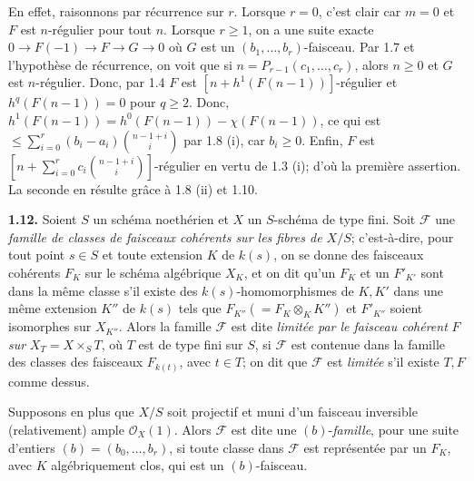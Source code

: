 En
effet, raisonnons par récurrence sur \(r\). Lorsque \(r=0\), c'est clair car \(m=0\) et \(F\) est \(n\)-régulier pour tout \(n\). Lorsque \(r\ge1\), on a une suite exacte $0\longrightarrow F(-1)\longrightarrow F\longrightarrow G\longrightarrow0$ où \(G\) est un \((b_1,\ldots,b_r)\)-faisceau. Par 1.7 et l'hypothèse de récurrence, on voit que si \(n=P_{r-1}(c_1,\ldots,c_r)\), alors \(n\ge0\) et \(G\) est \(n\)-régulier. Donc, par 1.4 \(F\) est \([n+h^1(F(n-1))]\)-régulier et \(h^q(F(n-1))=0\) pour \(q\ge2\). Donc, \(h^1(F(n-1))=h^0(F(n-1))-\chi(F(n-1))\), ce qui est \(\le \sum_{i=0}^{r}(b_i-a_i)\binom{n-1+i}{i}\) par 1.8 (i), car \(b_i\ge0\). Enfin, \(F\) est \(\left[n+\sum_{i=0}^{r}c_i\binom{n-1+i}{i}\right]\)-régulier en vertu de 1.3 (i); d'où la première assertion. La seconde en résulte grâce à 1.8 (ii) et 1.10.

\textbf{1.12.} Soient \(S\) un schéma noethérien et \(X\) un \(S\)-schéma de type fini. Soit \(\mathcal F\) une \emph{famille de classes de faisceaux cohérents sur les fibres de \(X/S\)}; c'est-à-dire, pour tout point \(s\in S\) et toute extension \(K\) de \(k(s)\), on se donne des faisceaux cohérents \(F_K\) sur le schéma algébrique \(X_K\), et on dit qu'un \(F_K\) et un \(F'_{K'}\) sont dans la même classe s'il existe des \(k(s)\)-homomorphismes de \(K,K'\) dans une même extension \(K''\) de \(k(s)\) tels que \(F_{K''}(=F_K\otimes_K K'')\) et \(F'_{K''}\) soient isomorphes sur \(X_{K''}\). Alors la famille \(\mathcal F\) est dite \emph{limitée par le faisceau cohérent} \(F\) \emph{sur} \(X_T=X\times_S T\), où \(T\) est de type fini sur \(S\), si \(\mathcal F\) est contenue dans la famille des classes des faisceaux \(F_{k(t)}\), avec \(t\in T\); on dit que \(\mathcal F\) est \emph{limitée} s'il existe \(T,F\) comme dessus.

Supposons en plus que \(X/S\) soit projectif et muni d'un faisceau inversible (relativement) ample \(\mathcal O_X(1)\). Alors \(\mathcal F\) est dite une \((b)\)-\emph{famille}, pour une suite d'entiers \((b)=(b_0,\ldots,b_r)\), si toute classe dans \(\mathcal F\) est représentée par un \(F_K\), avec \(K\) algébriquement clos, qui est un \((b)\)-faisceau.


